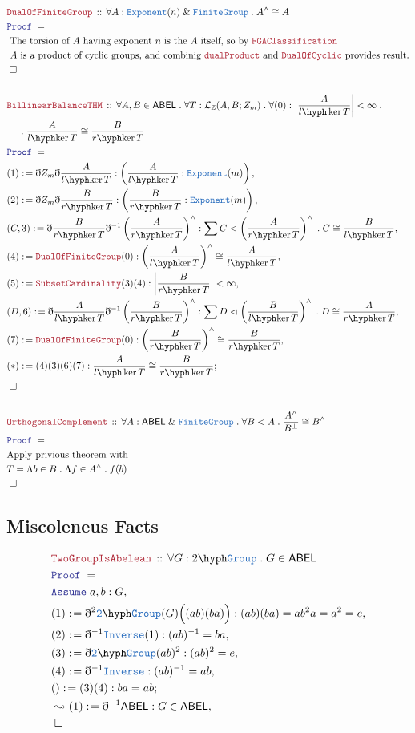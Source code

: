\documentclass[12pt]{scrartcl}
\newcommand{\TYPE}[1]{\textcolor{NavyBlue}{\mathtt{#1}}}
\newcommand{\LOGIC}[1]{\textcolor{Blue}{\mathtt{#1}}}
\newcommand{\THM}[1]{\textcolor{Maroon}{\mathtt{#1}}}
\renewcommand{\.}{\; . \;}
\newcommand{\de}{: \kern 0.1pc =}
\newcommand{\Theorem}[2]{& \THM{#1} \, :: \, #2 \\ & \Proof = \\ }
\newcommand{\NewLine}{\\ & \kern 1pc}
\newcommand{\Page}[1]{ \begin{align*} #1 \end{align*}   }
\newcommand{ \bd }{ \ByDef }
\renewcommand{\And}{\; \& \;}
\newcommand{\Int}{\mathbb{Z} }
\newcommand{\Say}[3]{& #1 \de #2 : #3, \\}
\newcommand{\Conclude}[3]{& #1 \de #2 : #3; \\}
\newcommand{\Derive}[3]{& \leadsto #1 \de #2 : #3, \\}
\newcommand{\Assume}[2]{& \LOGIC{Assume} \; #1 : #2, \\}
\newcommand{\QED}{\; \square}
\newcommand{\EndProof}{& \QED \\}
\newcommand{\ByDef}{\eth}
\newcommand{\Proof}{\LOGIC{Proof} \; }
\newcommand{\Nrml}{\vartriangleleft}
\newcommand{\FG}{\TYPE{FiniteGroup}}
\newcommand{\ABEL}{\mathsf{ABEL}}
\begin{document}
\Page{
	\Theorem{DualOfFiniteGroup}{\forall A : \TYPE{Exponent}(n) \And \FG \.  A^\wedge \cong A  }
	& \text{ The torsion of $A$ having exponent $n$ is the $A$ itself, so by $\THM{FGAClassification}$}\\
	& \text{  $A$ is a product of cyclic groups, and combinig $\THM{dualProduct}$ and $\THM{DualOfCyclic}$  
		provides result.}\\
	\EndProof
	\\
	\Theorem{BillinearBalanceTHM}{ \forall A,B \in \ABEL  \. 
		\forall T : \mathcal{L}_{\Int}(A,B;Z_m) \. \forall (0) : \left|\frac{A}{l\hyph\ker T}\right| < \infty  
		\.  \NewLine \.  \frac{A}{l\hyph\!\ker T} \cong \frac{B}{r\hyph\!\ker T}}
	\Say{(1)}{\bd Z_m \bd \frac{A}{l\hyph\! \ker T}}{ \left( \frac{A}{l\hyph\! \ker T}  : \TYPE{Exponent}(m) \right) }
	\Say{(2)}{\bd Z_m \bd \frac{B}{r\hyph\! \ker T}}{ \left( \frac{B}{r\hyph\! \ker T}  : \TYPE{Exponent}(m) \right) }
	\Say{(C,3)}{\bd \frac{B}{r\hyph\!\ker T} \bd^{-1} \left( \frac{A}{r\hyph\!\ker T} \right)^\wedge   }
	{  \sum C  \Nrml  \left( \frac{A}{r\hyph\!\ker T} \right)^\wedge  \. C \cong \frac{B}{l\hyph\!\ker T} }
	\Say{(4)}{\THM{DualOfFiniteGroup}(0)}{  \left(\frac{A}{l\hyph\!\ker T} \right)^\wedge \cong \frac{A}{l\hyph\!\ker T} }
	\Say{(5)}{\THM{SubsetCardinality}(3)(4)}{ \left| \frac{B}{r\hyph\! \ker T} \right| < \infty  }
	\Say{(D,6)}{\bd \frac{A}{l\hyph\!\ker T} \bd^{-1} \left( \frac{B}{r\hyph\!\ker T} \right)^\wedge   }
	{  \sum D  \Nrml  \left( \frac{B}{l\hyph\!\ker T} \right)^\wedge  \. D \cong \frac{A}{r\hyph\!\ker T} }
	\Say{(7)}{\THM{DualOfFiniteGroup}(0)}{  \left(\frac{B}{r\hyph\!\ker T} \right)^\wedge \cong \frac{B}{r\hyph\!\ker T} }
	\Conclude{(*)}{ (4)(3)(6)(7)}{\frac{A}{l\hyph\ker T} \cong \frac{B}{r\hyph\ker T}}
	\EndProof
	\\
	\Theorem{OrthogonalComplement}{\forall A : \ABEL \And \FG \. \forall B \Nrml A \.  \frac{A^\wedge}{B^\bot} \cong B^\wedge}
	& \text{Apply privious theorem with} \\
	& T = \Lambda b \in B \. \Lambda f \in  A^\wedge \. f(b)  \\
	\EndProof
}
\newpage
\subsection{Miscoleneus Facts}
\Page{
	\Theorem{TwoGroupIsAbelean}{\forall G : 2\hyph\TYPE{Group} \. G \in \ABEL}
	\Assume{a,b}{G}
	\Say{(1)}{ \bd^2 \TYPE 2\hyph\TYPE{Group}(G)\Big((ab)(ba)\Big)}{(ab)(ba) = ab^2a = a^2 = e}
	\Say{(2)}{\bd^{-1}\TYPE{Inverse}(1)}{(ab)^{-1} = ba}
	\Say{(3)}{ \bd \TYPE 2\hyph \TYPE{Group} (ab)^2   }{ (ab)^2 = e }
	\Say{(4)}{ \bd^{-1} \TYPE{Inverse}  }{ (ab)^{-1} = ab    }
	\Conclude{()}{(3)(4)}{  ba = ab}
	\Derive{(1)}{\bd^{-1}\ABEL}{ G \in \ABEL}
	\EndProof
}
\end{document}
